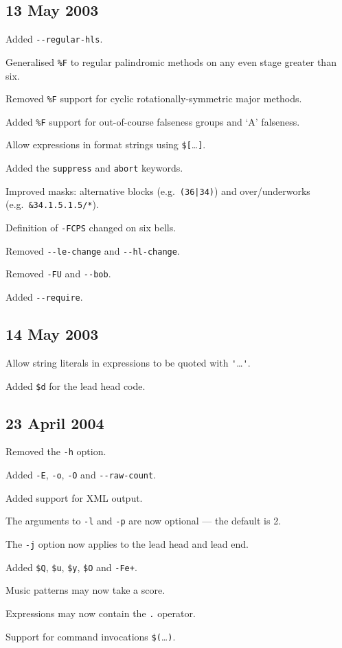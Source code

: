 \documentclass[a4paper,11pt,oneside]{book}
\begin{document}
\subsection{13 May 2003}
\begin{list}{}{\leftmargin=1em\itemsep=0em}
\item Added \verb+--regular-hls+.
\item Generalised \verb+%F+ to regular palindromic methods on 
any even stage greater than six.
\item Removed \verb+%F+ support for cyclic rotationally-symmetric
major methods.
\item Added \verb+%F+ support for out-of-course falseness groups and `A' 
falseness.
\item Allow expressions in format strings using \verb+$[+\ldots\verb+]+.
\item Added the \verb+suppress+ and \verb+abort+ keywords.
\item Improved masks: alternative blocks (e.g.\ \verb+(36|34)+) and 
over/underworks (e.g.\ \verb+&34.1.5.1.5/*+).
\item Definition of \verb+-FCPS+ changed on six bells.
\item Removed \verb+--le-change+ and \verb+--hl-change+.
\item Removed \verb+-FU+ and \verb+--bob+.
\item Added \verb+--require+.
\end{list}

\subsection{14 May 2003}
\begin{list}{}{\leftmargin=1em\itemsep=0em}
\item Allow string literals in expressions to be quoted with 
\verb+'+\ldots\verb+'+.
\item Added \verb+$d+ for the lead head code.
\end{list}

\subsection{23 April 2004}
\begin{list}{}{\leftmargin=1em\itemsep=0em}
\item Removed the \verb+-h+ option.
\item Added \verb+-E+, \verb+-o+, \verb+-O+ and \verb+--raw-count+.
\item Added support for XML output.
\item The arguments to \verb+-l+ and \verb+-p+ are now optional — 
the default is 2.
\item The \verb+-j+ option now applies to the lead head and lead end.
\item Added \verb+$Q+, \verb+$u+, \verb+$y+, \verb+$O+ and \verb!-Fe+!.
\item Music patterns may now take a score.
\item Expressions may now contain the \verb+.+ operator.
\item Support for command invocations \verb+$(+\ldots\verb+)+.
\end{list}
\end{document}
